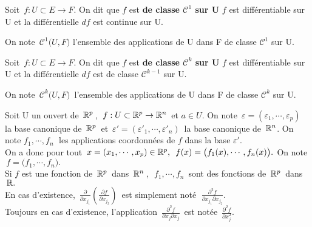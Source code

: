 \vspace{1.2cm}

Soit \(\,f:U\subset E\to F\). On dit que $f$ est \textbf{de classe $\mathscr{C}^1$ sur U} \ssi $f$ est différentiable sur U et la différentielle $df$ est continue sur U.\vspace{0.1cm}\\
\begin{small}On note $\,\mathscr{C}^1\bigl(U,F\bigr)$ l'ensemble des applications de U dans F de classe $\mathscr{C}^1$ sur U.\end{small}

\vspace{1cm}

Soit \(\,f:U\subset E\to F\). On dit que $f$ est \textbf{de classe $\mathscr{C}^k$ sur U} \ssi $f$ est différentiable sur U et la différentielle $df$ est de classe $\mathscr{C}^{k-1}$ sur U.\vspace{0.1cm}\\
\begin{small}On note \(\,\mathscr{C}^k\bigl(U,F\bigr)\,\) l'ensemble des applications de U dans F de classe $\mathscr{C}^k$ sur U.\end{small}

\vspace{1.3cm}

Soit U un ouvert de \(\,\mathbb{R}^p\,\), \(\,f:U\subset \mathbb{R}^p\to \mathbb{R}^n\,\) et \(a\in U\). On note \(\,\varepsilon=(\varepsilon_1,\cdots,\varepsilon_p)\,\) la base canonique de \(\,\mathbb{R}^p\,\) et \(\,\varepsilon'=(\varepsilon'_1,\cdots,\varepsilon'_n)\,\) la base canonique de \(\,\mathbb{R}^n\). On note \(f_1,\cdots,f_n\;\) les applications coordonnées de $f$ dans la base $\varepsilon'$. \\
On a donc pour tout \(\, x=(x_1,\cdots,x_p)\in \mathbb{R}^p,\ \,f(x)=\bigl(f_1(x),\cdots,f_n(x)\bigr).\) On note \(\,f=\bigl(f_1,\cdots,f_n\bigr).\)\\
Si $f$ est une fonction de \(\,\mathbb{R}^p\,\) dans \(\,\mathbb{R}^n\,\),\ \(\,f_1,\cdots,f_n\,\) sont des fonctions de \(\,\mathbb{R}^p\,\) dans \(\,\mathbb{R}.\)\vspace{0.1cm}\\
En cas d'existence, \(\,\displaystyle\frac{\partial}{\partial x_{j_1}}\!\!\left(\!\frac{\partial f}{\partial x_{j_2}}\!\right)\,\) est simplement noté \(\;\displaystyle \frac{\partial ^2\!f}{\partial x_{j_1}\partial x_{j_2}}\).\vspace{0.2cm}\\
Toujours en cas d'existence, l'application \(\,\displaystyle \frac{\partial^2\! f}{\partial x_j \partial x_j}\,\) est notée \(\,\displaystyle\frac{\partial^2\!f}{\partial x_j^2}.\)


